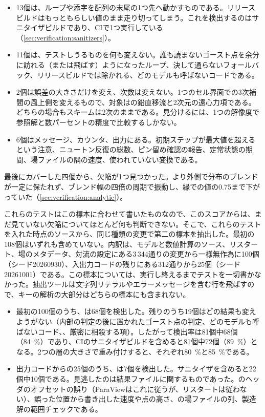 \begin{itemize}
  \item 13個は、ループや添字を配列の末尾の1つ先へ動かすものである。リリースビルドはもっともらしい値のまま走り切ってしまう。これを検出するのはサニタイザビルドであり、CIで1つ実行している（\cref{sec:verification:sanitizers}）。
  \item 11個は、テストしうるものを何も変えない。誰も読まないゴースト点を余分に訪れる（または飛ばす）ようになったループ、決して通らないフォールバック、リリースビルドでは除かれる、どのモデルも呼ばないコードである。
  \item 2個は誤差の大きさだけを変え、次数は変えない。1つのセル界面での3次補間の風上側を変えるもので、対象はの鉛直移流と2次元の遠心力項である。どちらの場合もスキームは2次のままである。見分けるには、1つの解像度で参照解と数パーセントの精度で比較するしかない。
  \item 6個はメッセージ、カウンタ、出力にある。初期ステップが最大値を超えるという注意、ニュートン反復の総数、ピン留め確認の報告、定常状態の期間、場ファイルの隅の速度、使われていない変換である。
\end{itemize}

最後にカバーした四個から、欠陥が1つ見つかった。より外側で分布のブレンドが一定に保たれず、ブレンド幅の四倍の周期で振動し、縁での値の0.75まで下がっていた（\cref{sec:verification:analytic}）。

これらのテストはこの標本に合わせて書いたものなので、このスコアからは、まだ見ていない欠陥についてほとんど何も判断できない。そこで、これらのテストを入れた時点のソースから、同じ種類の変更で第二の標本を抽出した。最初の108個はいずれも含めていない。内訳は、モデルと数値計算のソース、リスタート、場のメタデータ、対流の設定にある3\,344通りの変更から一様無作為に100個（シード20260930）、入出力コードの残りにある312通りから25個（シード20261001）である。この標本については、実行し終えるまでテストを一切書かなかった。抽出ツールは文字列リテラルやエラーメッセージを含む行を飛ばすので、キーの解析の大部分はどちらの標本にも含まれない。

\begin{itemize}
  \item 最初の100個のうち、は68個を検出した。残りのうち19個はどの結果も変えようがない（内部の判定の後に置かれたゴースト点の判定、どのモデルも呼ばないコード、、厳密に相殺する項）。したがって検出率は81個中68個（\SI{84}{\percent}）であり、CIのサニタイザビルドを含めると81個中72個（\SI{89}{\percent}）となる。2つの層の大きさで重み付けすると、それぞれ\SI{80}{\percent}と\SI{85}{\percent}である。
  \item 出力コードからの25個のうち、は7個を検出した。サニタイザを含めると22個中10個である。見逃したのは結果ファイルに関するものであった。のヘッダのオフセットの誤り（ParaViewはこれに従うが、リスタートは従わない）、誤った位置から書き出した速度や点の高さ、の場ファイルの列、製造解の範囲チェックである。
\end{itemize}

